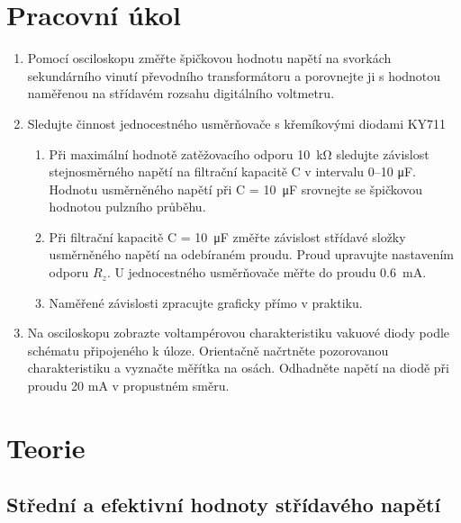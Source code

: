\documentclass{../concepts/prepareprotokol} %
\begin{document}
\renewcommand{\figurename}{Graf}
\renewcommand{\refname}{Literatura}

\maketitle

\section{Pracovní úkol}
\begin{enumerate}
    \item Pomocí osciloskopu změřte špičkovou hodnotu napětí na svorkách sekundárního vinutí převodního transformátoru a porovnejte ji s hodnotou naměřenou na střídavém rozsahu digitálního voltmetru.
    \item Sledujte činnost jednocestného usměrňovače s křemíkovými diodami KY711
    \begin{enumerate}
        \item Při maximální hodnotě zatěžovacího odporu \qty{10}{\kilo\ohm} sledujte závislost stejnosměrného napětí na filtrační kapacitě C v intervalu 0–10 \unit{\micro\farad}. Hodnotu usměrněného napětí při C = \qty{10}{\micro\farad} srovnejte se špičkovou hodnotou pulzního průběhu.
        \item Při filtrační kapacitě C = \qty{10}{\micro\farad} změřte závislost střídavé složky usměrněného napětí na odebíraném proudu. Proud upravujte nastavením odporu $R_z$. U jednocestného usměrňovače měřte do proudu \qty{0.6}{\milli\ampere}.
        \item Naměřené závislosti zpracujte graficky přímo v praktiku.
    \end{enumerate}
    \item Na osciloskopu zobrazte voltampérovou charakteristiku vakuové diody podle schématu připojeného k úloze. Orientačně načrtněte pozorovanou charakteristiku a vyznačte měřítka na osách. Odhadněte napětí na diodě při proudu 20 mA v propustném směru.
\end{enumerate}

\section{Teorie}
\subsection{Střední a efektivní hodnoty střídavého napětí}
\end{document}
